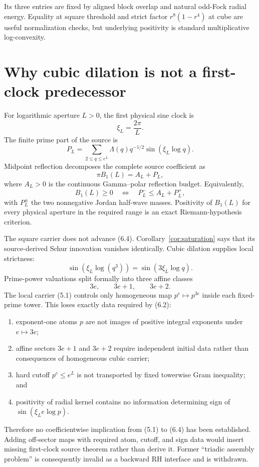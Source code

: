 \documentclass[11pt]{article}
\theoremstyle{definition}
\theoremstyle{remark}
\newcommand{\LambdaVM}{\Lambda}
\begin{document}
Its three entries are fixed by aligned block overlap and natural odd-Fock radial energy.
Equality at square threshold and strict factor $r^8(1-r^4)$ at cube are useful normalization
checks, but underlying positivity is standard multiplicative log-convexity.

\section{Why cubic dilation is not a first-clock predecessor}
\label{sec:rhroute}

For logarithmic aperture $L>0$, the first physical sine clock is
\[
 \xi_L=\frac{2\pi}{L}.                                 \tag{6.1}
\]
The finite prime part of the source is
\[
 P_L=
 \sum_{2\leq q\leq e^L}
 \LambdaVM(q)q^{-1/2}\sin(\xi_L\log q).                \tag{6.2}
\]
Midpoint reflection decomposes the complete source coefficient as
\[
 \pi B_1(L)=A_L+P_L,                                   \tag{6.3}
\]
where $A_L>0$ is the continuous Gamma--polar reflection budget.  Equivalently,
\[
 B_1(L)\geq0
 \quad\Longleftrightarrow\quad
 P_L^{-}\leq A_L+P_L^{+},                              \tag{6.4}
\]
with $P_L^\pm$ the two nonnegative Jordan half-wave masses.  Positivity of
$B_1(L)$ for every physical aperture in the required range is an exact
Riemann-hypothesis criterion.

The square carrier does not advance (6.4). Corollary~\ref{cor:saturation} says that its
source-derived Schur innovation vanishes identically. Cubic dilation supplies local strictness:
\[
 \sin(\xi_L\log(q^3))=\sin(3\xi_L\log q).              \tag{6.5}
\]
Prime-power valuations split formally into three affine classes
\[
 3e,\qquad 3e+1,\qquad 3e+2.                           \tag{6.6}
\]
The local carrier (5.1) controls only homogeneous map $p^e\mapsto p^{3e}$ inside each fixed-prime
tower. This loses exactly data required by (6.2):
\begin{enumerate}
\item exponent-one atoms $p$ are not images of positive integral exponents under $e\mapsto3e$;
\item affine sectors $3e+1$ and $3e+2$ require independent initial data rather than consequences
of homogeneous cubic carrier;
\item hard cutoff $p^e\leq e^L$ is not transported by fixed towerwise Gram inequality; and
\item positivity of radial kernel contains no information determining sign of
$\sin(\xi_L e\log p)$.
\end{enumerate}
Therefore no coefficientwise implication from (5.1) to (6.4) has been established. Adding
off-sector maps with required atom, cutoff, and sign data would insert missing first-clock
source theorem rather than derive it. Former ``triadic assembly problem'' is consequently
invalid as a backward RH interface and is withdrawn.
\end{document}
